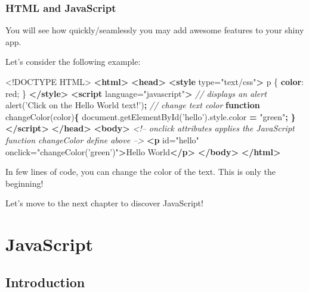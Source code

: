 \documentclass[]{book}
\newenvironment{Shaded}{\begin{snugshade}}{\end{snugshade}}
\newcommand{\AttributeTok}[1]{\textcolor[rgb]{0.77,0.63,0.00}{#1}}
\newcommand{\CommentTok}[1]{\textcolor[rgb]{0.56,0.35,0.01}{\textit{#1}}}
\newcommand{\DataTypeTok}[1]{\textcolor[rgb]{0.13,0.29,0.53}{#1}}
\newcommand{\DecValTok}[1]{\textcolor[rgb]{0.00,0.00,0.81}{#1}}
\newcommand{\KeywordTok}[1]{\textcolor[rgb]{0.13,0.29,0.53}{\textbf{#1}}}
\newcommand{\NormalTok}[1]{#1}
\newcommand{\OperatorTok}[1]{\textcolor[rgb]{0.81,0.36,0.00}{\textbf{#1}}}
\newcommand{\OtherTok}[1]{\textcolor[rgb]{0.56,0.35,0.01}{#1}}
\newcommand{\StringTok}[1]{\textcolor[rgb]{0.31,0.60,0.02}{#1}}
\newcommand{\VariableTok}[1]{\textcolor[rgb]{0.00,0.00,0.00}{#1}}
\begin{document}
\hypertarget{html-and-javascript}{%
\subsection{HTML and JavaScript}\label{html-and-javascript}}

You will see how quickly/seamlessly you may add awesome features to your shiny app.

Let's consider the following example:

\begin{Shaded}
\begin{Highlighting}[]
\DataTypeTok{<!DOCTYPE }\NormalTok{HTML}\DataTypeTok{>}
\KeywordTok{<html>}
  \KeywordTok{<head>}
    \KeywordTok{<style}\OtherTok{ type=}\StringTok{"text/css"}\KeywordTok{>}
\NormalTok{      p \{}
        \KeywordTok{color}\NormalTok{: }\DecValTok{red}\NormalTok{;}
\NormalTok{      \}}
    \KeywordTok{</style>}
    \KeywordTok{<script}\OtherTok{ language=}\StringTok{"javascript"}\KeywordTok{>}
      \CommentTok{// displays an alert }
      \AttributeTok{alert}\NormalTok{(}\StringTok{'Click on the Hello World text!'}\NormalTok{)}\OperatorTok{;}
      \CommentTok{// change text color}
      \KeywordTok{function} \AttributeTok{changeColor}\NormalTok{(color)}\OperatorTok{\{}
        \VariableTok{document}\NormalTok{.}\AttributeTok{getElementById}\NormalTok{(}\StringTok{'hello'}\NormalTok{).}\VariableTok{style}\NormalTok{.}\AttributeTok{color} \OperatorTok{=} \StringTok{"green"}\OperatorTok{;}
      \OperatorTok{\}}
    \KeywordTok{</script>}
  \KeywordTok{</head>}
  \KeywordTok{<body>}
    \CommentTok{<!-- onclick attributes applies the JavaScript function changeColor define above -->}
    \KeywordTok{<p}\OtherTok{ id=}\StringTok{"hello"}\OtherTok{ onclick=}\StringTok{"changeColor('green')"}\KeywordTok{>}\NormalTok{Hello World}\KeywordTok{</p>}
  \KeywordTok{</body>}
\KeywordTok{</html>}
\end{Highlighting}
\end{Shaded}

In few lines of code, you can change the color of the text. This is only the beginning!

Let's move to the next chapter to discover JavaScript!

\hypertarget{survival-kit-javascript}{%
\chapter{JavaScript}\label{survival-kit-javascript}}

\hypertarget{introduction}{%
\section{Introduction}\label{introduction}}
\end{document}
